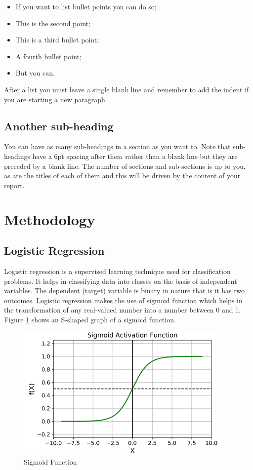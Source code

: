 \documentclass[a4paper,10pt]{article}
\begin{document}
\begin{itemize}
    \item If you want to list bullet points you can do so;
    \item This is the second point;
    \item This is a third bullet point;
    \item A fourth bullet point;
    \item But you can.
\end{itemize}   

After a list you must leave a single blank line and remember to add the indent if you are starting a new paragraph.

\subsection{Another sub-heading}

You can have as many sub-headings in a section as you want to. Note that sub-headings have a 6pt spacing after them rather than a blank line but they are preceded by a blank line. The number of sections and sub-sections is up to you, as are the titles of each of them and this will be driven by the content of your report.

\section{Methodology}

\subsection{Logistic Regression}

Logistic regression is a supervised learning technique used for classification problems. It helps in classifying data into classes on the basis of independent variables. The dependent (target) variable is binary in nature that is it has two outcomes. 
Logistic regression makes the use of sigmoid function which helps in the transformation of any real-valued number into a number between 0 and 1. Figure \ref{sigmoid} shows an S-shaped graph of a sigmoid function. 


\begin{figure}[ht]
\centering
\includegraphics[height=6.6cm]{figures/sigmoid.png}
\caption{Sigmoid Function}
\label{sigmoid}
\end{figure}
\end{document}
